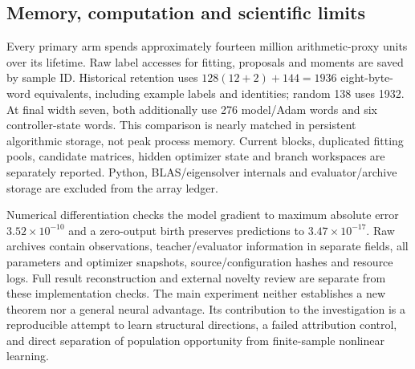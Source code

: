 \subsection{Memory, computation and scientific limits}
Every primary arm spends approximately fourteen million arithmetic-proxy
units over its lifetime. Raw label accesses for fitting, proposals and moments
are saved by sample ID. Historical retention uses
$128(12+2)+144=1936$ eight-byte-word equivalents, including example labels and
identities; random 138 uses 1932. At final width seven, both additionally use
276 model/Adam words and six controller-state words. This comparison is nearly
matched in persistent algorithmic storage, not peak process memory. Current
blocks, duplicated fitting pools, candidate matrices, hidden optimizer state
and branch workspaces are separately reported. Python, BLAS/eigensolver
internals and evaluator/archive storage are excluded from the array ledger.

Numerical differentiation checks the model gradient to maximum absolute
error $3.52\times10^{-10}$ and a zero-output birth preserves predictions to
$3.47\times10^{-17}$. Raw archives contain observations, teacher/evaluator
information in separate fields, all parameters and optimizer snapshots,
source/configuration hashes and resource logs. Full result reconstruction
and external novelty review are separate from these implementation checks.
The main experiment neither establishes a new theorem nor a general neural
advantage. Its contribution to the investigation is a reproducible attempt
to learn structural directions, a failed attribution control, and direct
separation of population opportunity from finite-sample nonlinear learning.
